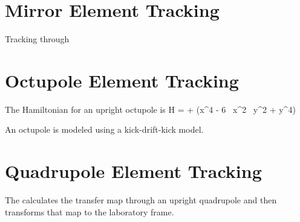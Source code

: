 \section{Mirror Element Tracking}
\label{s:mirror.std}

Tracking through

\section{Octupole Element Tracking}
\label{s:octupole.std}

The Hamiltonian for an upright octupole is
\Begineq
  H =  +  (x^4 - 6 \, x^2 \, y^2 + y^4)
\Endeq

An octupole is modeled using a kick-drift-kick model.

\section{Quadrupole Element Tracking}
\label{s:quadrupole.std}

The  calculates the transfer map through an upright
quadrupole and then transforms that map to the laboratory frame.

